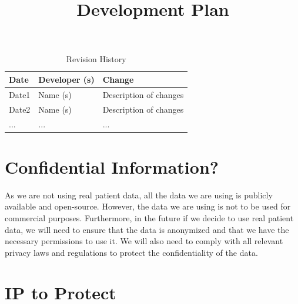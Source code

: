 \documentclass{article}
\title{Development Plan\\\progname}
\author{\authname}
\date{}
\begin{document}
\maketitle

\begin{table}[hp]
\caption{Revision History} \label{TblRevisionHistory}
\begin{tabularx}{\textwidth}{llX}
\toprule
\textbf{Date} & \textbf{Developer (s)} & \textbf{Change}\\
\midrule
Date1 & Name (s) & Description of changes\\
Date2 & Name (s) & Description of changes\\
... & ... & ...\\
\bottomrule
\end{tabularx}
\end{table}

\newpage{}



\section{Confidential Information?}

As we are not using real patient data, all the data we are using is publicly available and open-source. However, the data we are using is not to be used for commercial purposes. Furthermore, in the future if we decide to use real patient data, we will need to ensure that the data is anonymized and that we have the necessary permissions to use it. We will also need to comply with all relevant privacy laws and regulations to protect the confidentiality of the data.
\section{IP to Protect}
\end{document}
